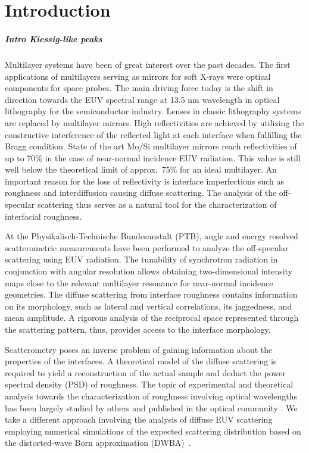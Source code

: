 \chapter{Introduction} \label{ch:Intro}
\paragraph{Intro Kiessig-like peaks}
Multilayer systems have been of great interest over the past decades. The first applications of multilayers serving as mirrors for soft X-rays were optical components for space probes. The main driving force today is the shift in direction towards the EUV spectral range at 13.5 nm wavelength in optical lithography for the semiconductor industry. Lenses in classic lithography systems are replaced by multilayer mirrors. High  reflectivities are achieved by utilizing the constructive interference of the reflected light at each interface when fulfilling the Bragg condition. State of the art Mo/Si multilayer mirrors reach reflectivities of up to 70\% \cite{braun_mo/si_2002, feigl_euv_2006} in the case of near-normal incidence EUV radiation. This value is still well below the theoretical limit of approx.~75\% for an ideal multilayer. An important reason for the loss of reflectivity is interface imperfections such as roughness and interdiffusion causing diffuse scattering. The analysis of the off-
specular scattering 
thus serves as a 
natural tool for the characterization of interfacial roughness. 

At the Physikalisch-Technische Bundesanstalt (PTB), angle and energy resolved scatterometric measurements have been performed to analyze the off-specular scattering using EUV radiation. The tunability of synchrotron radiation in conjunction with angular resolution allows obtaining two-dimensional intensity maps close to the relevant multilayer resonance for near-normal incidence geometries. The diffuse scattering from interface roughness contains information on its morphology, such as lateral and vertical correlations, its jaggedness, and mean amplitude. A rigorous analysis of the reciprocal space represented through the scattering pattern, thus, provides access to the interface morphology.

Scatterometry poses an inverse problem of gaining information about the properties of the interfaces. A theoretical model of the diffuse scattering is required to yield a reconstruction of the actual sample and deduct the power spectral density (PSD) of roughness. The topic of experimental and theoretical analysis towards the characterization of roughness involving optical wavelengths has been largely studied by others and published in the optical community \cite{amra_light_1993, amra_light_1994, elson_light_1980, elson_relationship_1983, schroder_angle-resolved_2011, schroder_spectral_2014}. We take a different approach involving the analysis of diffuse EUV scattering employing numerical simulations of the expected scattering distribution based on the distorted-wave Born approximation (DWBA)~\cite{holy_nonspecular_1994, holy_x-ray_1993}.

